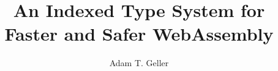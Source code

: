 \documentclass[gpscopy,onehalfspacing,11pt]{ubcdiss}
\author{Adam T. Geller}
\title{An Indexed Type System for Faster and Safer WebAssembly}
\theoremstyle{definition}
\theoremstyle{plain}
\begin{document}
\maketitle

\makecommitteepage


\cleardoublepage


\cleardoublepage

\tableofcontents                %
\cleardoublepage

\listoffigures                  %
\cleardoublepage


\cleardoublepage


\cleardoublepage

\mainmatter

\raggedbottom











\end{document}
